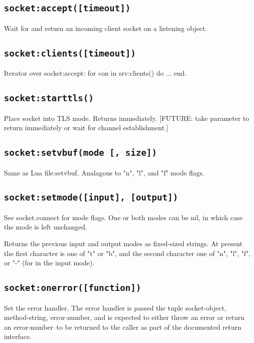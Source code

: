 \documentclass[11pt, oneside]{memoir}
\newcommand*{\fn}[1]{\texttt{#1}\xspace}
\begin{document}
\subsection[\fn{socket:accept}]{\fn{socket:accept([timeout])}}
	Wait for and return an incoming client socket on a listening object.

\subsection[\fn{socket:clients}]{\fn{socket:clients([timeout])}}
	Iterator over socket:accept: for con in srv:clients() do ... end.


\subsection[\fn{socket:starttls}]{\fn{socket:starttls()}}
	Place socket into TLS mode. Returns immediately. [FUTURE: take
	parameter to return immediately or wait for channel establishment.]

\subsection[\fn{socket:setvbuf}]{\fn{socket:setvbuf(mode [, size])}}
	Same as Lua file:setvbuf. Analagous to "n", "l", and "f" mode flags.

\subsection[\fn{socket:setmode}]{\fn{socket:setmode([input], [output])}}
	See socket.connect for mode flags. One or both modes can be nil,
	in which case the mode is left unchanged.

	Returns the previous input and output modes as fixed-sized strings.
	At present the first character is one of "t" or "b", and the second
	character one of "n", "l", "f", or "-" (for in the input mode).

\subsection[\fn{socket:onerror}]{\fn{socket:onerror([function])}}
	Set the error handler. The error handler is passed the tuple
	socket-object, method-string, error-number, and is expected to
	either throw an error or return an error-number--to be returned to
	the caller as part of the documented return interface.
\end{document}
